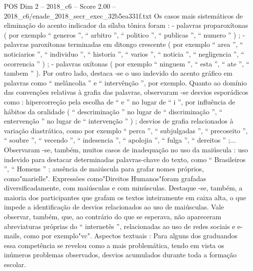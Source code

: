 \begin{textsample}{POS Dim 2 – 2018\_c6 – Score 2.00 – 2018\_c6/enade\_2018\_secr\_exec\_32b5ea331f.txt}
Os casos mais sistemáticos de eliminação do acento indicador da sílaba tônica foram : - palavras proparoxítonas ( por exemplo “ generos ”, “ arbitro ”, “ politico ”, “ publicas ”, “ numero ” ) ; - palavras paroxítonas terminadas em ditongo crescente ( por exemplo “ area ”, “ noticiarios ”, “ individuo ”, “ historia ”, “ varios ”, “ noticia ”, “ negligencia ”, “ ocorrencia ” ) ; - palavras oxítonas ( por exemplo “ ninguem ”, “ esta ”, “ ate ”, “ tambem ” ).
Por outro lado, destaca -se o uso indevido do acento gráfico em palavras como “ melâncolia ” e “ intervênção ”, por exemplo.
Quanto ao domínio das convenções relativas à grafia das palavras, observaram -se desvios esporádicos como : hipercorreção pela escolha de “ e ” no lugar de “ i ”, por influência de hábitos da oralidade ( “ descriminação ” no lugar de “ discriminação ”, “ entervenção ” no lugar de “ intervenção ” ) ; desvios de grafia relacionados à variação diastrática, como por exemplo “ perca ”, “ subjulgadas ”, “ precoseito ”, “ soubre ”, “ vecendo ”, “ indesencia ”, “ apolojia ”, “ fulga ”, “ dereitos ” ;...
Observaram -se, também, muitos casos de inadequação no uso da maiúscula : uso indevido para destacar determinadas palavras-chave do texto, como “ Brasileiros ”, “ Homens ” ; ausência de maiúscula para grafar nomes próprios, como"marielle".
Expressões como"Direitos Humanos"foram grafadas diversificadamente, com maiúsculas e com minúsculas.
Destaque -se, também, a maioria dos participantes que grafam os textos inteiramente em caixa alta, o que impede a identificação de desvios relacionados ao uso de maiúsculas.
Vale observar, também, que, ao contrário do que se esperava, não apareceram abreviaturas próprias do “ internetês ”, relacionadas ao uso de redes sociais e e-mails, como por exemplo"vc".
Aspectos textuais : Para alguns dos graduandos essa competência se revelou como a mais problemática, tendo em vista os inúmeros problemas observados, desvios acumulados durante toda a formação escolar.

\end{textsample}
